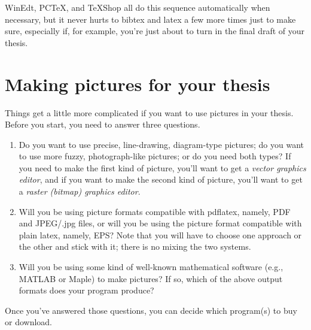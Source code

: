 \documentclass[modernstyle,12pt]{sjsuthesis}
\theoremstyle{definition}
\begin{document}
WinEdt, PCTeX, and TeXShop all do this sequence automatically when
necessary, but it never hurts to bibtex and latex a few more times
just to make sure, especially if, for example, you're just about to
turn in the final draft of your thesis.



\section{Making pictures for your thesis}

Things get a little more complicated if you want to use pictures in
your thesis.  Before you start, you need to answer three questions.

\begin{enumerate}
\item Do you want to use precise, line-drawing, diagram-type pictures;
  do you want to use more fuzzy, photograph-like pictures; or do you
  need both types?  If you need to make the first kind of picture,
  you'll want to get a {\it vector graphics editor}, and if you want
  to make the second kind of picture, you'll want to get a {\it raster
    (bitmap) graphics editor}.

\item Will you be using picture formats compatible with pdflatex,
  namely, PDF and JPEG/.jpg files, or will you be using the picture
  format compatible with plain latex, namely, EPS?  Note that you will
  have to choose one approach or the other and stick with it; there is
  no mixing the two systems.

\item Will you be using some kind of well-known mathematical software
  (e.g., MATLAB or Maple) to make pictures?  If so, which of the above
  output formats does your program produce?
\end{enumerate}

Once you've answered those questions, you can decide which program(s)
to buy or download.
\end{document}
